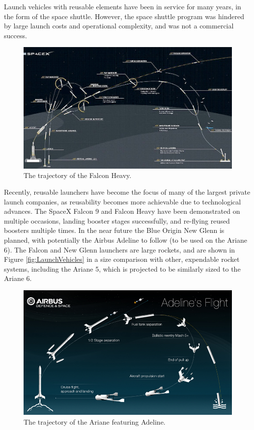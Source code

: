     
    Launch vehicles with reusable elements have been in service for many years, in the form of the space shuttle. However, the space shuttle program was hindered by large launch costs and operational complexity, and was not a commercial success\cite{Launius2006}. 
    \begin{figure}[ht]
    	\centering
    	\includegraphics[width=1\linewidth]{"figures/2_literature-review/FalconTrajectory"}
    	\caption{The trajectory of the Falcon Heavy\cite{FalconHeavy}.}
    	\label{fig:FalconTrajectory}
    \end{figure}
    Recently, reusable launchers have become the focus of many of the largest private launch companies, as reusability becomes more achievable due to technological advances\cite{Foust2018,Mosher2018}. The SpaceX Falcon 9 and Falcon Heavy have been demonstrated on multiple occasions, landing booster stages successfully, and re-flying reused boosters multiple times\cite{Foust2018}. In the near future the Blue Origin New Glenn is planned\cite{Foust2018}, with potentially the Airbus Adeline to follow (to be used on the Ariane 6)\cite{Adeline}. The Falcon and New Glenn launchers are large rockets, and are shown in Figure \ref{fig:LaunchVehicles} in a size comparison with other, expendable rocket systems, including the Ariane 5, which is projected to be similarly sized to the Ariane 6. 
     

    
    
    
    
    
    \begin{figure}[ht]
    	\centering
    	\includegraphics[width=0.7\linewidth]{figures/2_literature-review/visuel_adeline1}
    	\caption{The trajectory of the Ariane featuring Adeline\cite{Adelineb}.}
    	\label{fig:visuel_adeline1}
    \end{figure}
    
